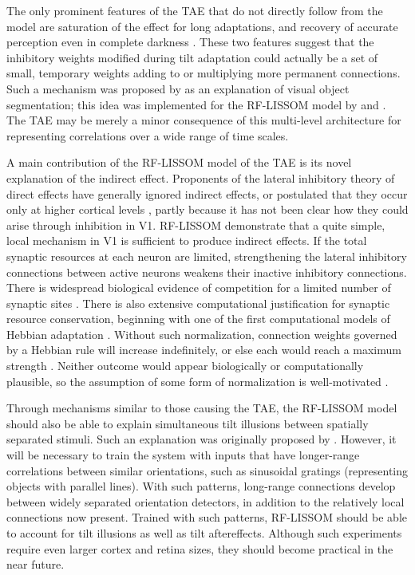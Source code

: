 \documentclass[10pt]{article}   %
\begin{document}
The only prominent features of the TAE that do not directly follow
from the model are saturation of the effect for long adaptations, and
recovery of accurate perception even in complete darkness
\cite{greenlee:vres87sat,magnussen:vres86}.  These two features
suggest that the inhibitory weights modified during tilt adaptation
could actually be a set of small, temporary weights adding to or
multiplying more permanent connections.  Such a mechanism was proposed
by  as an explanation of visual object
segmentation; this idea was implemented for the RF-LISSOM model by
 and .  The TAE may
be merely a minor consequence of this multi-level architecture for
representing correlations over a wide range of time scales.

A main contribution of the RF-LISSOM model of the TAE is its novel
explanation of the indirect effect.  Proponents of the lateral
inhibitory theory of direct effects have generally ignored indirect
effects, or postulated that they occur only at higher cortical levels 
\cite{wenderoth:vres88}, partly because it has not been clear how they
could arise through inhibition in V1.  
RF-LISSOM demonstrate that a quite simple, local 
mechanism in V1 is sufficient to produce indirect effects.  If the
total synaptic resources at each neuron are limited, strengthening the
lateral inhibitory connections between active neurons weakens their
inactive inhibitory connections.  There is widespread biological
evidence of competition for a limited number of synaptic sites
\cite*{bourgeois:synaptogenesis,hayes:optic,murray:target,pallas:compensation,purves:neurotrophic}.
There is also extensive computational justification for synaptic
resource conservation, beginning with one of the first computational
models of Hebbian adaptation \cite*{rochester:iretit56}.  Without
such normalization, connection weights governed by a Hebbian rule will
increase indefinitely, or else each would reach a maximum strength
\cite{miller:rolenc}.  Neither outcome would appear biologically or
computationally plausible, so the assumption of some form of
normalization is well-motivated \cite{sirosh:phd}.

Through mechanisms similar to those causing the TAE, the RF-LISSOM
model should also be able to explain simultaneous tilt illusions
between spatially separated stimuli.  Such an explanation was
originally proposed by .  However, it
will be necessary to train the system with inputs that have
longer-range correlations between similar orientations, such as
sinusoidal gratings (representing objects with parallel lines).  With
such patterns, long-range connections develop between widely separated
orientation detectors, in addition to the relatively local connections
now present.  Trained with such patterns, RF-LISSOM should be able to
account for tilt illusions as well as tilt aftereffects.  Although
such experiments require even larger cortex and retina sizes, they
should become practical in the near future.
\end{document}
